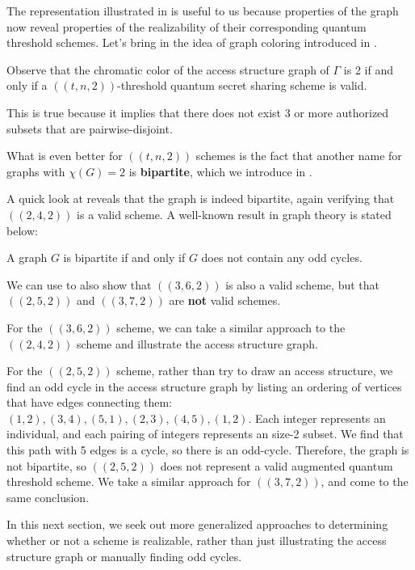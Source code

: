 The representation illustrated in  is useful to us because properties of the graph now reveal properties of the realizability of their corresponding quantum threshold schemes. Let's bring in the idea of graph coloring introduced in .

\begin{theorem}
    \label{thm:2-color-access}
	Observe that the chromatic color of the access structure graph of $\Gamma$ is 2 if and only if a $((t,n,2))$-threshold quantum secret sharing scheme is valid.
\end{theorem}

This is true because it implies that there does not exist 3 or more authorized subsets that are pairwise-disjoint.

What is even better for $((t,n,2))$ schemes is the fact that another name for graphs with $\chi(G)=2$ is \textbf{bipartite}, which we introduce in .

A quick look at  reveals that the graph is indeed bipartite, again verifying that $((2,4,2))$ is a valid scheme. A well-known result in graph theory is stated below:

\begin{theorem}
	\label{thm:bipartite}
	A graph $G$ is bipartite if and only if $G$ does not contain any odd cycles.
\end{theorem}

We can use  to also show that $((3,6,2))$ is also a valid scheme, but that $((2,5,2))$ and $((3,7,2))$ are \textbf{not} valid schemes. 

For the $((3,6,2))$ scheme, we can take a similar approach to the $((2,4,2))$ scheme and illustrate the access structure graph.

For the $((2,5,2))$ scheme, rather than try to draw an access structure, we find an odd cycle in the access structure graph by listing an ordering of vertices that have edges connecting them: $(1,2), (3,4), (5,1), (2,3), (4,5), (1,2)$. Each integer represents an individual, and each pairing of integers represents an size-2 subset. We find that this path with 5 edges is a cycle, so there is an odd-cycle. Therefore, the graph is not bipartite, so $((2,5,2))$ does not represent a valid augmented quantum threshold scheme. We take a similar approach for $((3,7,2))$, and come to the same conclusion.

In this next section, we seek out more generalized approaches to determining whether or not a scheme is realizable, rather than just illustrating the access structure graph or manually finding odd cycles.

